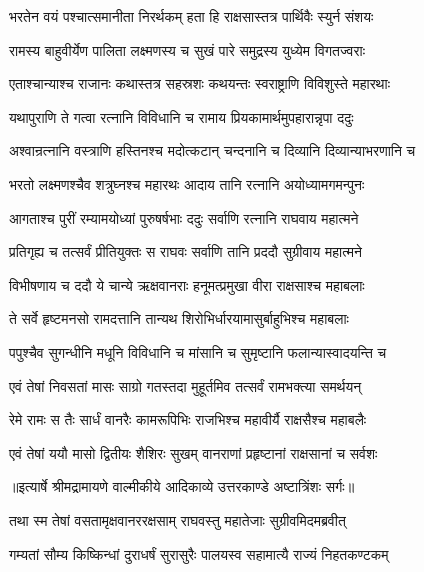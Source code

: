 \twolineshloka
{भरतेन वयं पश्चात्समानीता निरर्थकम्}
{हता हि राक्षसास्तत्र पार्थिवैः स्युर्न संशयः} %

\twolineshloka
{रामस्य बाहुवीर्येण पालिता लक्ष्मणस्य च}
{सुखं पारे समुद्रस्य युध्येम विगतज्वराः} %

\twolineshloka
{एताश्चान्याश्च राजानः कथास्तत्र सहस्रशः}
{कथयन्तः स्वराष्ट्राणि विविशुस्ते महारथाः} %

\twolineshloka
{यथापुराणि ते गत्वा रत्नानि विविधानि च}
{रामाय प्रियकामार्थमुपहारान्नृपा ददुः} %

\twolineshloka
{अश्वान्रत्नानि वस्त्राणि हस्तिनश्च मदोत्कटान्}
{चन्दनानि च दिव्यानि दिव्यान्याभरणानि च} %

\twolineshloka
{भरतो लक्ष्मणश्चैव शत्रुघ्नश्च महारथः}
{आदाय तानि रत्नानि अयोध्यामगमन्पुनः} %

\twolineshloka
{आगताश्च पुरीं रम्यामयोध्यां पुरुषर्षभाः}
{ददुः सर्वाणि रत्नानि राघवाय महात्मने} %

\twolineshloka
{प्रतिगृह्य च तत्सर्वं प्रीतियुक्तः स राघवः}
{सर्वाणि तानि प्रददौ सुग्रीवाय महात्मने} %

\twolineshloka
{विभीषणाय च ददौ ये चान्ये ऋक्षवानराः}
{हनूमत्प्रमुखा वीरा राक्षसाश्च महाबलाः} %

\twolineshloka
{ते सर्वे हृष्टमनसो रामदत्तानि तान्यथ}
{शिरोभिर्धारयामासुर्बाहुभिश्च महाबलाः} %

\twolineshloka
{पपुश्चैव सुगन्धीनि मधूनि विविधानि च}
{मांसानि च सुमृष्टानि फलान्यास्वादयन्ति च} %

\twolineshloka
{एवं तेषां निवसतां मासः साग्रो गतस्तदा}
{मुहूर्तमिव तत्सर्वं रामभक्त्या समर्थयन्} %

\twolineshloka
{रेमे रामः स तैः सार्धं वानरैः कामरूपिभिः}
{राजभिश्च महावीर्यै राक्षसैश्च महाबलैः} %

\twolineshloka
{एवं तेषां ययौ मासो द्वितीयः शैशिरः सुखम्}
{वानराणां प्रहृष्टानां राक्षसानां च सर्वशः} %


{॥इत्यार्षे श्रीमद्रामायणे वाल्मीकीये आदिकाव्ये उत्तरकाण्डे अष्टात्रिंशः सर्गः॥}


\twolineshloka
{तथा स्म तेषां वसतामृक्षवानररक्षसाम्}
{राघवस्तु महातेजाः सुग्रीवमिदमब्रवीत्} %

\twolineshloka
{गम्यतां सौम्य किष्किन्धां दुराधर्षं सुरासुरैः}
{पालयस्व सहामात्यै राज्यं निहतकण्टकम्} %

